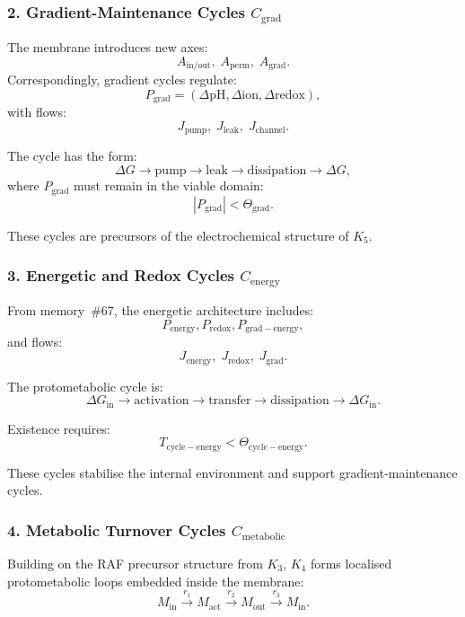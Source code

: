 \subsubsection{2. Gradient-Maintenance Cycles $C_{\mathrm{grad}}$}

The membrane introduces new axes:
\[
  A_{\mathrm{in/out}},\;
  A_{\mathrm{perm}},\;
  A_{\mathrm{grad}}.
\]
Correspondingly, gradient cycles regulate:
\[
  P_{\mathrm{grad}}=
    (\Delta \mathrm{pH}, \Delta \mathrm{ion}, \Delta \mathrm{redox}),
\]
with flows:
\[
  J_{\mathrm{pump}},\;
  J_{\mathrm{leak}},\;
  J_{\mathrm{channel}}.
\]

The cycle has the form:
\[
  \Delta G \to \mathrm{pump} \to
  \mathrm{leak} \to \mathrm{dissipation} \to
  \Delta G,
\]
where $P_{\mathrm{grad}}$ must remain in the viable domain:
\[
  |P_{\mathrm{grad}}| < \Theta_{\mathrm{grad}}.
\]

These cycles are precursors of the electrochemical structure of $K_5$.

\subsubsection{3. Energetic and Redox Cycles $C_{\mathrm{energy}}$}

From memory~\#67, the energetic architecture includes:
\[
  P_{\mathrm{energy}},
  P_{\mathrm{redox}},
  P_{\mathrm{grad-energy}},
\]
and flows:
\[
  J_{\mathrm{energy}},\;
  J_{\mathrm{redox}},\;
  J_{\mathrm{grad}}.
\]

The protometabolic cycle is:
\[
  \Delta G_{\mathrm{in}} \to 
  \mathrm{activation} \to
  \mathrm{transfer} \to 
  \mathrm{dissipation} \to 
  \Delta G_{\mathrm{in}}.
\]

Existence requires:
\[
  T_{\mathrm{cycle-energy}} < \Theta_{\mathrm{cycle-energy}}.
\]

These cycles stabilise the internal environment and support
gradient-maintenance cycles.

\subsubsection{4. Metabolic Turnover Cycles $C_{\mathrm{metabolic}}$}

Building on the RAF precursor structure from $K_3$, $K_4$ forms
localised protometabolic loops embedded inside the membrane:
\[
  M_{\mathrm{in}} \xrightarrow{r_1}
  M_{\mathrm{act}} \xrightarrow{r_2}
  M_{\mathrm{out}} \xrightarrow{r_3}
  M_{\mathrm{in}}.
\]

